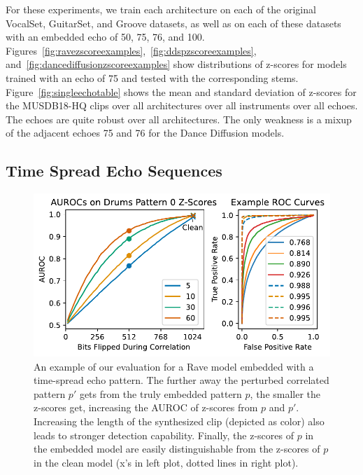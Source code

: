 \documentclass[letterpaper]{article} %
\begin{document}
For these experiments, we train each architecture on each of the original VocalSet, GuitarSet, and Groove datasets, as well as on each of these datasets with an embedded echo of 50, 75, 76, and 100.  Figures~\ref{fig:ravezscoreexamples},~\ref{fig:ddspzscoreexamples}, and~\ref{fig:dancediffusionzscoreexamples} show distributions of z-scores for models trained with an echo of 75 and tested with the corresponding stems.  Figure~\ref{fig:singleechotable} shows the mean and standard deviation of z-scores for the MUSDB18-HQ clips over all architectures over all instruments over all echoes.  The echoes are quite robust over all architectures.  The only weakness is a mixup of the adjacent echoes 75 and 76 for the Dance Diffusion models.






\subsection{Time Spread Echo Sequences}

\begin{figure}
    \centering
    \includegraphics[width=\columnwidth]{figs/DrumsPNModel_pn0.pdf}
    \caption{An example of our evaluation for a Rave model embedded with a time-spread echo pattern.  The further away the perturbed correlated pattern $p'$ gets from the truly embedded pattern $p$, the smaller the z-scores get, increasing the AUROC of z-scores from $p$ and $p'$.  Increasing the length of the synthesized clip (depicted as color) also leads to stronger detection capability.  Finally, the z-scores of $p$ in the embedded model are easily distinguishable from the z-scores of $p$ in the clean model (x's in left plot, dotted lines in right plot).}
    \label{fig:drumspn7}
\end{figure}
\end{document}
